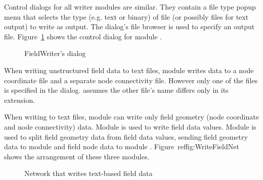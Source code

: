 Control dialogs for all writer modules are similar.  They contain a file
type popup menu that selects the type (e.g. text or binary) of file
(or possibly files for text output) to write as output.  The dialog's
file browser is used to specify an output file.  Figure~\ref{fig:FieldWriterGUI}
shows the control dialog for module .  

\begin{figure}[htb]
  \centering
  \begin{makeimage} \end{makeimage}
  \FieldWriterGUI
  \caption{\label{fig:FieldWriterGUI} FieldWriter's dialog}
\end{figure}

When writing unstructured field data to text files, module 
writes data to a node coordinate file and a separate node connectivity
file.  However only one of the files is specified in the dialog.
 assumes the other file's name differs only in its
extension.

When writing to text files, module  can write only
field geometry (node coordinate and node connectivity) data.  Module
 is used to write field data values.  Module
 is used to split field geometry data from
field data values, sending field geometry data to module
 and field node data to module
.  Figure~ref{fig:WriteFieldNet} shows the
arrangement of these three modules.

\begin{figure}[htb]
  \centering
  \begin{makeimage} \end{makeimage}
  \WriteFieldNet
  \caption{\label{fig:WriteFieldNet} Network that writes text-based field data}
\end{figure}



